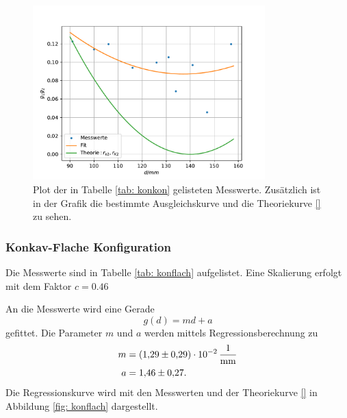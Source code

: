 \begin{figure}[h!]
  \centering
  \includegraphics[width=0.8\textwidth]{../Messdaten/plots/konkon.pdf}
  \caption{Plot der in Tabelle \ref{tab: konkon} gelisteten Messwerte. Zusätzlich ist in der Grafik die bestimmte Ausgleichskurve und die Theoriekurve \eqref{} zu sehen.}
  \label{fig: konkon}
\end{figure}

\FloatBarrier
\FloatBarrier
\subsubsection{Konkav-Flache Konfiguration}
Die Messwerte sind in Tabelle \ref{tab: konflach} aufgelistet.
Eine Skalierung erfolgt mit dem Faktor $c=\num{0.46}$

An die Messwerte wird eine Gerade
\begin{equation*}
  g(d)=md+a
\end{equation*}
gefittet. Die Parameter $m$ und $a$ werden mittels Regressionsberechnung zu
\begin{align}
  \label{eq: konflach}
  \begin{aligned}
    m&=\SI{1.29 \pm 0.29 e-2}{\per\milli\meter}\\
    a&=\num{1.46\pm0.27}.
  \end{aligned}
\end{align}
Die Regressionskurve wird mit den Messwerten und der Theoriekurve \eqref{} in Abbildung \ref{fig: konflach} dargestellt.

